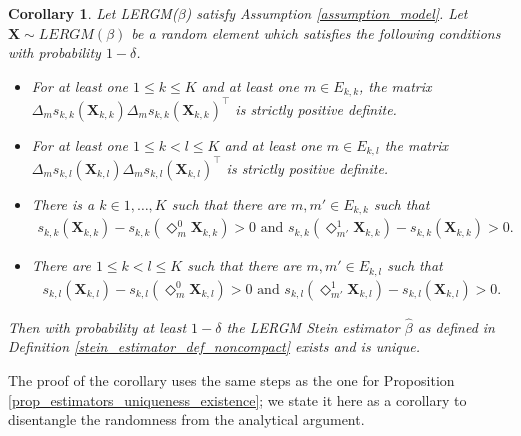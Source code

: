 \documentclass{article}
\newtheorem{Corollary}[Theorem]{Corollary}
\begin{document}
\begin{Corollary}\label{corollary_random_existence_uniqueness}
    Let LERGM($\beta$) satisfy Assumption \ref{assumption_model}. 
    Let $\mathbf{X}\sim LERGM(\beta)$ be a random element  which satisfies the following conditions with probability $1 - \delta$.
    \begin{itemize}
        \item[(i)] For at least one $1 \leq k \leq K$ and at least one $m \in E_{k,k}$, the matrix $\Delta_ms_{k,k}(\mathbf{X}_{k,k})\Delta_m s_{k,k}(\mathbf{X}_{k,k})^{\top}$ is strictly positive definite.
        \item[(ii)] For at least one  $1 \leq k < l \leq K$ and at least one $m \in E_{k,l}$ the matrix $\Delta_ms_{k,l}(\mathbf{X}_{k,l})\Delta_m s_{k,l}(\mathbf{X}_{k,l})^{\top}$ is strictly positive definite.
        \item[(iii)]  There is a $k \in 1, \ldots, K$  such that there are  $m, m' \in E_{k,k}$ such that 
        \begin{align*} 
            s_{k,k}(\mathbf{X}_{k,k}) -s_{k,k}(\Diamond_{m}^{0}\mathbf{X}_{k,k}) > 0 \text{ and } s_{k,k}(\Diamond_{m'}^{1}\mathbf{X}_{k,k}) -s_{k,k}(\mathbf{X}_{k,k}) > 0.     
        \end{align*}  
        \item[(iv)] There are $ 1 \leq k < l  \leq K $ such that there are   $m,  m' \in E_{k,l}$  such that 
        \begin{align*} 
            s_{k,l}(\mathbf{X}_{k,l}) -s_{k,l}(\Diamond_{m}^{0}\mathbf{X}_{k,l}) > 0 \text{ and } s_{k,l}(\Diamond_{m'}^{1}\mathbf{X}_{k,l}) -s_{k,l}(\mathbf{X}_{k,l}) > 0 .
        \end{align*}
    \end{itemize}
    Then with probability at least $1 - \delta$ the LERGM Stein estimator $\hat{\beta}$ as defined in Definition \ref{stein_estimator_def_noncompact} exists and is unique.
\end{Corollary}
The proof of the corollary uses the same steps as the one for Proposition \ref{prop_estimators_uniqueness_existence}; we state it here as a corollary to disentangle the randomness from the analytical argument.
\end{document}
